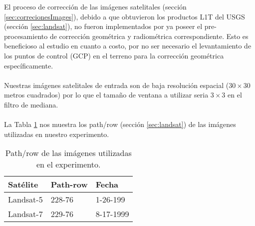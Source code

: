 El proceso de correcci\'on de las im\'agenes satelitales (secci\'on \ref{sec:correcionesImages}), debido a que obtuvieron los productos L1T del USGS (secci\'on \ref{sec:landsat}), no fueron implementados por ya poseer el pre-procesamiento de correcci\'on geom\'etrica y radiom\'etrica correspondiente. Esto es beneficioso al estudio en cuanto a costo, por no ser necesario el levantamiento de los puntos de control (GCP) en el terreno para la correcci\'on geom\'etrica espec\'ificamente.\\~\\
Nuestras im\'agenes satelitales de entrada son de baja resoluci\'on espacial ($ 30 \times 30 $ metros cuadrados) por lo que el tama\~{n}o de ventana a utilizar seria $ 3 \times 3 $ en el filtro de mediana. \\~\\
 La Tabla \ref{t:pathRow} nos muestra los path/row (secci\'on \ref{sec:landsat}) de las im\'agenes utilizadas en nuestro experimento.

\begin{table}[H]
	\centering

	\begin{tabular}{|l|l|l|}
		\hline
		\rowcolor[HTML]{EFEFEF} 
		\textbf{Sat\'elite} & \textbf{Path-row} & \textbf{Fecha}  \\ \hline
		Landsat-5         & 228-76            & 1-26-199       \\ \hline
		Landsat-7         & 229-76            & 8-17-1999      \\ \hline
	\end{tabular}
		\caption{Path/row de las im\'agenes utilizadas en el experimento.}
		\label{t:pathRow}
\end{table}

